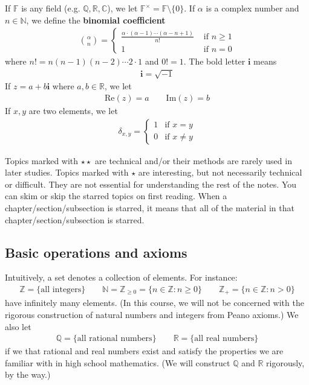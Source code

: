 \documentclass[12pt,b5paper,notitlepage]{article}
\theoremstyle{definition}
\theoremstyle{plain}
\newcommand{\im}{\mathbf{i}}
\newcommand{\Cbb}{\mathbb C}
\newcommand{\Nbb}{\mathbb N}
\newcommand{\Zbb}{\mathbb Z}
\newcommand{\Qbb}{\mathbb Q}
\newcommand{\Rbb}{\mathbb R}
\newcommand{\Real}{\mathrm{Re}}
\newcommand{\Imag}{\mathrm{Im}}
\newcommand{\Fbb}{\mathbb F}
\newcommand{\dps}{\displaystyle}
\numberwithin{equation}{section}
\begin{document}
If $\Fbb$ is any field (e.g. $\Qbb,\Rbb,\Cbb$), we let $\Fbb^\times=\Fbb\setminus\{0\}$. \index{F@$\Fbb^\times=\Fbb\setminus\{0\}$} If $\alpha$ is a complex number and $n\in\Nbb$, we define the \textbf{binomial coefficient}  
\begin{align}
{\alpha\choose n}=\left\{
\begin{array}{ll}
\dps\frac{\alpha\cdot(\alpha-1)\cdots (\alpha-n+1)}{n!} &\text{ if }n\geq 1\\[1ex]
1&\text{ if }n=0
\end{array}
\right.
\end{align}
where $n!=n(n-1)(n-2)\cdots 2\cdot 1$ and $0!=1$. The bold letter $\im$ means \index{i@$\im=\sqrt{-1}$}
\begin{align*}
\im=\sqrt{-1}
\end{align*}
If $z=a+b\im$ where $a,b\in\Rbb$, we let
\begin{align*}
\Real(z)=a\qquad \Imag(z)=b
\end{align*}
If $x,y$ are two elements, we let 
\begin{align}\label{eq154}
\delta_{x,y}=\left\{
\begin{array}{ll}
1&\text{if }x=y\\
0&\text{if }x\neq y
\end{array}
\right.
\end{align}


Topics marked with $\star\star$ are technical and/or their methods are rarely used in later studies. Topics marked with $\star$ are interesting, but not necessarily technical or difficult. They are not essential for understanding the rest of the notes. You can skim or skip the starred topics on first reading. When a chapter/section/subsection is starred, it means that all of the material in that chapter/section/subsection is starred.




\subsection{Basic operations and axioms}
Intuitively, a set denotes a collection of elements. For instance:\index{N@$\Nbb=\{0,1,2,\dots\}$} \index{Z@$\Zbb_+=\{1,2,\dots\}$}
\begin{gather*}
\Zbb=\{\text{all integers}\}\qquad \Nbb=\Zbb_{\geq0}=\{n\in\Zbb:n\geq0\}\qquad \Zbb_+=\{n\in\Zbb:n>0\}
\end{gather*}
have infinitely many elements. (In this course, we will not be concerned with the rigorous construction of natural numbers and integers from Peano axioms.) We also let
\begin{align*}
\Qbb=\{\text{all rational numbers}\}\qquad\Rbb=\{\text{all real numbers}\}
\end{align*}
if we that rational and real numbers exist and satisfy the properties we are familiar with in high school mathematics. (We will construct $\Qbb$ and $\Rbb$ rigorously, by the way.)
\end{document}
